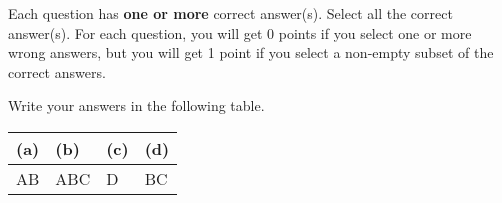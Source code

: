 
Each question has \textbf{one or more} correct answer(s). Select all the correct answer(s). For each question, you will get 0 points if you select one or more wrong answers, but you will get 1 point if you select a non-empty subset of the correct answers.

Write your answers in the following table.

\begin{table}[htbp]
	\centering
	\begin{tabular}{|p{2cm}|p{2cm}|p{2cm}|p{2cm}|}
		\hline
		(a) & (b) & (c) & (d) \\
		\hline
	    AB & ABC & D  & BC \\
		\hline
	\end{tabular}
\end{table}

